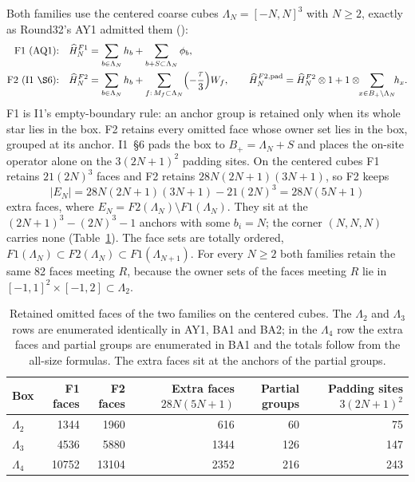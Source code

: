Both families use the centered coarse cubes $\Lambda_N=[-N,N]^3$ with
$N\ge2$, exactly as Round32's AY1 admitted them
():
\begin{equation}
 \begin{aligned}
 \text{F1 (AQ1):}\quad&\widehat H^{F1}_N=\sum_{b\in\Lambda_N}h_b
 +\sum_{b+S\subset\Lambda_N}\phi_b,\\
 \text{F2 (I1 \S6):}\quad&\widehat H^{F2}_N=\sum_{b\in\Lambda_N}h_b
 +\sum_{f:\,M_f\subset\Lambda_N}\Bigl(-\frac\tau3\Bigr)W_f,\qquad
 \widehat H^{F2,{\rm pad}}_N=\widehat H^{F2}_N\otimes1
 +1\otimes\!\!\sum_{x\in B_+\setminus\Lambda_N}\!\!h_x .
 \end{aligned}
 \label{eq:families}
\end{equation}
F1 is I1's empty-boundary rule: an anchor group is retained only when its
whole star lies in the box. F2 retains every omitted face whose owner set lies
in the box, grouped at its anchor. I1~\S6 pads the box to
$B_+=\Lambda_N+S$ and places the on-site operator alone on the
$3(2N+1)^2$ padding sites. On the centered cubes F1 retains $21(2N)^3$ faces
and F2 retains $28N(2N+1)(3N+1)$, so F2 keeps
\begin{equation}
 |E_N|=28N(2N+1)(3N+1)-21(2N)^3=28N(5N+1)
 \label{eq:extra-faces}
\end{equation}
extra faces, where $E_N=F2(\Lambda_N)\setminus F1(\Lambda_N)$. They sit at
the $(2N+1)^3-(2N)^3-1$ anchors with some $b_i=N$; the corner $(N,N,N)$
carries none (Table~\ref{tab:families}). The face sets are totally ordered,
$F1(\Lambda_N)\subset F2(\Lambda_N)\subset F1(\Lambda_{N+1})$. For every
$N\ge2$ both families retain the same 82 faces meeting $R$, because the owner
sets of the faces meeting $R$ lie in $[-1,1]^2\times[-1,2]\subset\Lambda_2$.

\begin{table}[htbp]
\centering\small
\caption{Retained omitted faces of the two families on the centered cubes.
The $\Lambda_2$ and $\Lambda_3$ rows are enumerated identically in AY1, BA1
and BA2; in the $\Lambda_4$ row the extra faces and partial groups are
enumerated in BA1 and the totals follow from the all-size formulas. The extra
faces sit at the anchors of the partial groups.}
\label{tab:families}
\begin{tabular}{lrrrrr}
\toprule
Box & F1 faces & F2 faces & Extra faces $28N(5N+1)$ & Partial groups & Padding sites $3(2N+1)^2$\\
\midrule
$\Lambda_2$ & 1344 & 1960 & 616 & 60 & 75\\
$\Lambda_3$ & 4536 & 5880 & 1344 & 126 & 147\\
$\Lambda_4$ & 10752 & 13104 & 2352 & 216 & 243\\
\bottomrule
\end{tabular}
\end{table}

